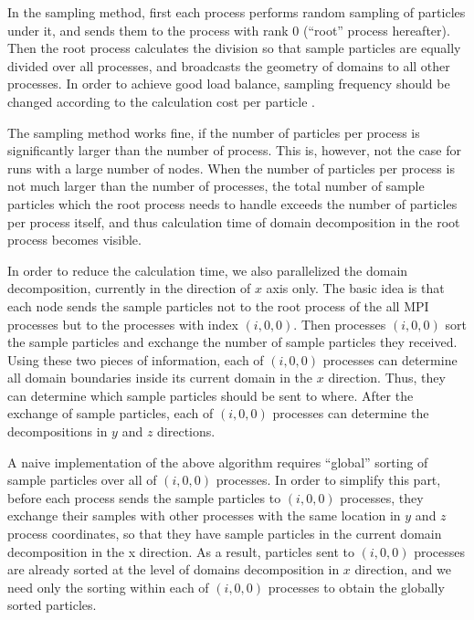 In the sampling method, first each process performs random sampling of
particles under it, and sends them to the process with rank 0
(``root'' process hereafter). Then the root process calculates the
division so that sample particles are equally divided over all
processes, and broadcasts the geometry of domains to all other
processes. In order to achieve good load balance, sampling frequency
should be changed according to the calculation cost per particle
\citep{2009PASJ...61.1319I}.

The sampling method works fine, if the number of particles per process
is significantly larger than the number of process. This is, however,
not the case for runs with a large number of nodes.  When the number
of particles per process is not much larger than the number of
processes, the total number of sample particles which the root process
needs to handle exceeds the number of particles per process itself,
and thus calculation time of domain decomposition in the root process
becomes visible.


In order to reduce the calculation time, we also parallelized the
domain decomposition, currently in the direction of $x$ axis only. The
basic idea is that each node sends the sample particles not to the
root process of the all MPI processes but to the processes with index
$(i,0,0)$. Then processes $(i,0,0)$ sort the sample particles and
exchange the number of sample particles they received. Using these two
pieces of information, each of $(i,0,0)$ processes can determine all
domain boundaries inside its current domain in the $x$ direction. Thus,
they can determine which sample particles should be sent to
where. After the exchange of sample particles, each of $(i,0,0)$
processes can determine the decompositions in $y$ and $z$ directions.

A naive implementation of the above algorithm requires ``global''
sorting of sample particles over all of $(i,0,0)$ processes. In order
to simplify this part, before each process sends the sample particles
to  $(i,0,0)$ processes, they exchange their samples with other
processes with the same location in $y$ and $z$ process coordinates, so
that they have sample particles in the current domain decomposition in
the x direction. As a result, particles sent to $(i,0,0)$ processes
are already sorted at the level of domains decomposition in $x$
direction, and we need only the  sorting within each of $(i,0,0)$
processes to obtain the globally sorted particles.

